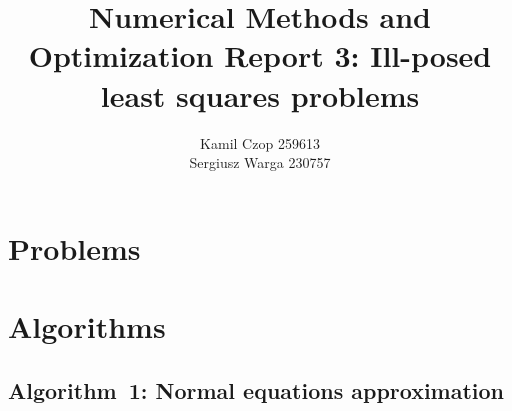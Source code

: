 \documentclass[a4paper]{article}
\title{Numerical Methods and Optimization Report 3:
Ill-posed least squares problems}
\author{Kamil Czop 259613\\Sergiusz Warga 230757}
\begin{document}
\maketitle
\tableofcontents
\listoftodos
\pagebreak

\section{Problems}








\clearpage

\section{Algorithms}
\subsection{Algorithm~1: Normal equations approximation}%
\label{algorithm:1}



\clearpage

\nocite{Zdunek, GoluVanl96}


\end{document}
